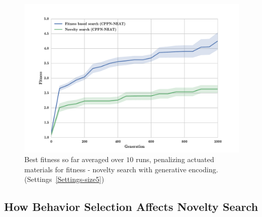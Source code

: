 \begin{figure}[t!]
\centering
\includegraphics[width=1.0\textwidth]{../Figures/Results/FitNovSize5Pen2.pdf}
\caption[]{Best fitness so far averaged over $10$ runs, penalizing actuated materials for fitness - novelty search with generative encoding. (Settings~\ref{Settings-size5})}
\label{fig:FitNovSize5Pen2}
\end{figure}

\subsection{How Behavior Selection Affects Novelty Search}

